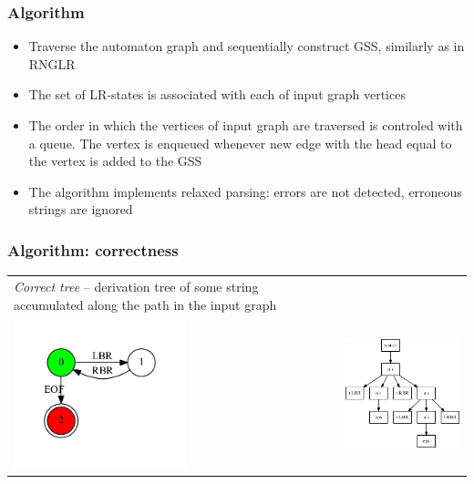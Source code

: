 \documentclass{beamer}
\begin{document}
\begin{frame}
  \transwipe[direction=90]
  \frametitle{Algorithm}
  \begin{itemize}
    \item Traverse the automaton graph and sequentially construct GSS, similarly as in RNGLR
    \item The set of LR-states is associated with each of input graph vertices
    \item The order in which the vertices of input graph are traversed is 
controled with a queue. The vertex is enqueued whenever new edge with the head 
equal to the vertex is added to the GSS
  \end{itemize}
  \begin{itemize}
    \item The algorithm implements relaxed parsing: errors are not detected, 
erroneous strings are ignored
  \end{itemize}

\end{frame}

\begin{frame}
\transwipe[direction=90]
\frametitle{Algorithm: correctness}
\begin{tabular}{p{5.3cm} p{6.7cm}}
\emph{Correct tree} -- derivation tree of some string accumulated along the 
path in the input graph
&
\\
\includegraphics[width=5cm]{pictures/in3.pdf}
&
\includegraphics[width=6cm]{pictures/sppf2.eps}
\end{tabular}
\end{frame}
\end{document}
